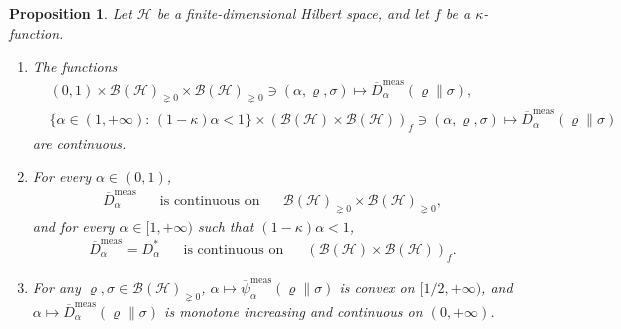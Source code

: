 \documentclass[unsortedaddress,superscriptaddress,pra,notitlepage]{revtex4}
\newtheorem{prop}[definition]{Proposition}
\def\B{{\mathcal B}}
\def\rho{\varrho}
\def\hil{{\mathcal H}}
\def\bz{\left(}
\def\jz{\right)}
\def\oll{\overline}
\def\nw{^{*}}
\def\meas{\mathrm{meas}}
\def\pne{_{\gneq 0}}
\def\pwr{\kappa}
\newcommand{\ds}{\mbox{ }\mbox{ }}
\begin{document}
\begin{prop}\label{prop:regmeas cont}
Let $\hil$ be a finite-dimensional Hilbert space, and let $f$ be a $\pwr$-function.
\begin{enumerate}
\item\label{regmeasured cont1}
The functions 
\begin{align}
&(0,1)\times\B(\hil)\pne\times\B(\hil)\pne\ni(\alpha,\rho,\sigma)\mapsto
\oll{D}_{\alpha}^{\meas}(\rho\|\sigma),\label{regmeas jointcont}\\
&\{\alpha\in(1,+\infty):\,(1-\pwr)\alpha<1\}\times\bz\B(\hil)\times\B(\hil)\jz_{f}\ni(\alpha,\rho,\sigma)\mapsto
\oll{D}_{\alpha}^{\meas}(\rho\|\sigma)\label{regmeas jointcont2}
\end{align}
are continuous.
\item\label{regmeasured cont2}
For every $\alpha\in(0,1)$,
\begin{align}\label{regmeas cont1}
\oll{D}_{\alpha}^{\meas} \ds\text{ is continuous on  }\ds\B(\hil)\pne\times\B(\hil)\pne,
\end{align}
and for every $\alpha\in[1,+\infty)$ such that $(1-\pwr)\alpha<1$,
\begin{align}\label{regmeas cont}
\oll{D}_{\alpha}^{\meas}=D_{\alpha}\nw \ds\text{ is continuous on  }\ds
\bz\B(\hil)\times\B(\hil)\jz_{f}.
\end{align}
\item\label{regmeasured cont3}
For any $\rho,\sigma\in \B(\hil)\pne$,
$\alpha\mapsto\oll{\psi}_{\alpha}^{\meas}(\rho\|\sigma)$ is convex on $[1/2,+\infty)$, and 
$\alpha\mapsto \oll{D}_{\alpha}^{\meas}(\rho\|\sigma)$ is monotone increasing and continuous
 on $(0,+\infty)$.
\end{enumerate}
\end{prop}
\end{document}
